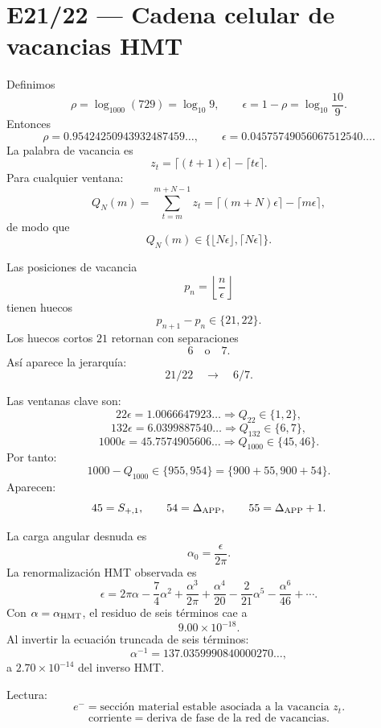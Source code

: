 
\section*{E21/22 --- Cadena celular de vacancias HMT}

Definimos
\[
\rho=\log_{1000}(729)=\log_{10}9,
\qquad
\epsilon=1-\rho=\log_{10}\frac{10}{9}.
\]
Entonces
\[
\rho=0.95424250943932487459\ldots,
\qquad
\epsilon=0.04575749056067512540\ldots.
\]
La palabra de vacancia es
\[
z_t=\lceil(t+1)\epsilon\rceil-\lceil t\epsilon\rceil.
\]
Para cualquier ventana:
\[
Q_N(m)=\sum_{t=m}^{m+N-1}z_t
=\lceil(m+N)\epsilon\rceil-\lceil m\epsilon\rceil,
\]
de modo que
\[
\boxed{Q_N(m)\in\{\lfloor N\epsilon\rfloor,\lceil N\epsilon\rceil\}.}
\]

Las posiciones de vacancia
\[
p_n=\left\lfloor\frac{n}{\epsilon}\right\rfloor
\]
tienen huecos
\[
p_{n+1}-p_n\in\{21,22\}.
\]
Los huecos cortos \(21\) retornan con separaciones
\[
6\quad\text{o}\quad7.
\]
Así aparece la jerarquía:
\[
\boxed{21/22\quad\longrightarrow\quad6/7.}
\]

Las ventanas clave son:
\[
22\epsilon=1.0066647923\ldots\Rightarrow Q_{22}\in\{1,2\},
\]
\[
132\epsilon=6.0399887540\ldots\Rightarrow Q_{132}\in\{6,7\},
\]
\[
1000\epsilon=45.7574905606\ldots\Rightarrow Q_{1000}\in\{45,46\}.
\]
Por tanto:
\[
1000-Q_{1000}\in\{955,954\}=\{900+55,900+54\}.
\]
Aparecen:
\[
45=S_{+,1},\qquad 54=\Delta_{\rm APP},\qquad55=\Delta_{\rm APP}+1.
\]

La carga angular desnuda es
\[
\alpha_0=\frac{\epsilon}{2\pi}.
\]
La renormalización HMT observada es
\[
\epsilon
=
2\pi\alpha
-\frac74\alpha^2
+\frac{\alpha^3}{2\pi}
+\frac{\alpha^4}{20}
-\frac{2}{21}\alpha^5
-\frac{\alpha^6}{46}
+\cdots.
\]
Con \(\alpha=\alpha_{\rm HMT}\), el residuo de seis términos cae a
\[
9.00\times10^{-18}.
\]
Al invertir la ecuación truncada de seis términos:
\[
\alpha^{-1}=137.0359990840000270\ldots,
\]
a \(2.70\times10^{-14}\) del inverso HMT.

Lectura:
\[
\boxed{e^-=\text{sección material estable asociada a la vacancia }z_t.}
\]
\[
\boxed{\text{corriente}=\text{deriva de fase de la red de vacancias}.}
\]
